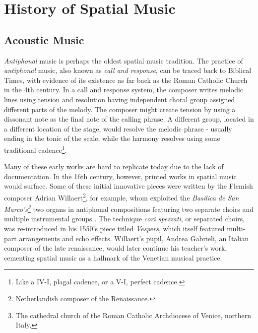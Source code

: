 \section{History of Spatial Music} \label{sec:hist_spat_mus}

\subsection{Acoustic Music} \label{subsec:acoustic_mus}


\textit{Antiphonal} music is perhaps the oldest spatial music tradition. The practice of \textit{antiphonal} music, also known as \textit{call and response}, can be traced back to Biblical Times, with evidence of its existence as far back as the Roman Catholic Church in the 4th century. In a call and response system, the composer writes melodic lines using tension and resolution having independent choral group assigned different parts of the melody. The composer might create tension by using a dissonant note as the final note of the calling phrase. A different group, located in a different location of the stage, would resolve the melodic phrase - usually ending in the tonic of the scale, while the harmony resolves using some traditional cadence\footnote{Like a IV-I, plagal cadence, or a V-I, perfect cadence.}. 

Many of these early works are hard to replicate today due to the lack of documentation. In the 16th century, however, printed works in spatial music would surface. Some of these initial innovative pieces were written by the Flemish composer Adrian Willaert\footnote{Netherlandish composer of the Renaissance.}, for example, whom exploited the \textit{Basilica de San Marco's\footnote{The cathedral church of the Roman Catholic Archdiocese of Venice, northern Italy.}} two organs in antiphonal compositions featuring two separate choirs and multiple instrumental groups \cite{arnold1959significance}. The technique \textit{cori spezzati}, or separated choirs, was re-introduced in his 1550's piece titled \textit{Vespers}, which itself featured multi-part arrangements and echo effects. Willaert's pupil, Andrea Gabrieli, an Italian composer of the late renaissance, would later continue his teacher's work, cementing spatial music as a hallmark of the Venetian musical practice. 

